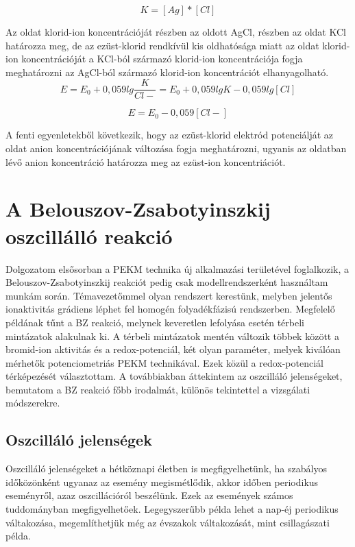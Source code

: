 \begin{enumerate}
\begin{equation}
K = [Ag] * [Cl]
\end{equation}

Az oldat klorid-ion koncentrációját részben az oldott AgCl, részben az oldat KCl határozza meg, de az ezüst-klorid rendkívül kis oldhatósága miatt az oldat klorid-ion koncentrációját a KCl-ból származó klorid-ion koncentrációja fogja meghatározni az AgCl-ból származó klorid-ion koncentrációt elhanyagolható.\\

\begin{equation}
E = E_\text{0} + 0,059 lg \frac{K}{Cl-} = E_\text{0} + 0,059 lg K - 0,059 lg [Cl]
\end{equation}

\begin{equation}
E = E_\text{0} - 0,059 [Cl-]
\end{equation}

A fenti egyenletekből következik, hogy az ezüst-klorid elektród potenciálját az oldat anion koncentrációjának változása fogja meghatározni, ugyanis az oldatban lévő anion koncentráció határozza meg az ezüst-ion koncentriációt.
\end{enumerate}
    


\section{A Belouszov-Zsabotyinszkij oszcillálló reakció}
Dolgozatom elsősorban a PEKM technika új alkalmazási területével foglalkozik, a Belouszov-Zsabotyinszkij reakciót pedig csak modellrendszerként használtam munkám során. Témavezetőmmel olyan rendszert kerestünk, melyben jelentős ionaktivitás grádiens léphet fel homogén folyadékfázisú rendszerben. Megfelelő példának tűnt a BZ reakció, melynek keveretlen lefolyása esetén térbeli mintázatok alakulnak ki. A térbeli mintázatok mentén változik többek között a bromid-ion aktivitás és a redox-potenciál, két olyan paraméter, melyek kiválóan mérhetők potenciometriás PEKM technikával. Ezek közül a redox-potenciál térképezését választottam. A továbbiakban áttekintem az oszcilláló jelenségeket, bemutatom a BZ reakció főbb irodalmát, különös tekintettel a vizsgálati módszerekre.

\subsection{Oszcilláló jelenségek}
Oszcilláló jelenségeket a hétköznapi életben is megfigyelhetünk, ha szabályos időközönként ugyanaz az esemény megismétlődik, akkor időben periodikus eseményről, azaz oszcillációról beszélünk. Ezek az események számos tuddományban megfigyelhetőek. Legegyszerűbb példa lehet a nap-éj periodikus váltakozása, megemlíthetjük még az évszakok váltakozását, mint csillagászati példa.

